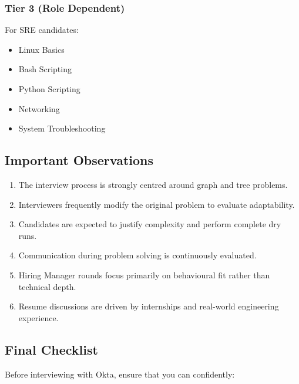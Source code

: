 \documentclass[11pt,a4paper]{article}
\begin{document}
\subsubsection{Tier 3 (Role Dependent)}

For SRE candidates:

\begin{itemize}
	\item Linux Basics
	\item Bash Scripting
	\item Python Scripting
	\item Networking
	\item System Troubleshooting
\end{itemize}


\subsection{Important Observations}

\begin{enumerate}
	\item The interview process is strongly centred around graph and tree problems.
	\item Interviewers frequently modify the original problem to evaluate adaptability.
	\item Candidates are expected to justify complexity and perform complete dry runs.
	\item Communication during problem solving is continuously evaluated.
	\item Hiring Manager rounds focus primarily on behavioural fit rather than technical depth.
	\item Resume discussions are driven by internships and real-world engineering experience.
\end{enumerate}


\subsection{Final Checklist}

Before interviewing with Okta, ensure that you can confidently:
\end{document}
